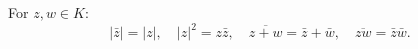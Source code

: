 For $z, w \in K$:
$$|\bar{z}| = |z|, \quad |z|^2 = z \bar{z}, \quad \overline{z + w} = \bar{z} + \bar{w}, \quad \overline{zw} = \bar{z} \bar{w}.$$